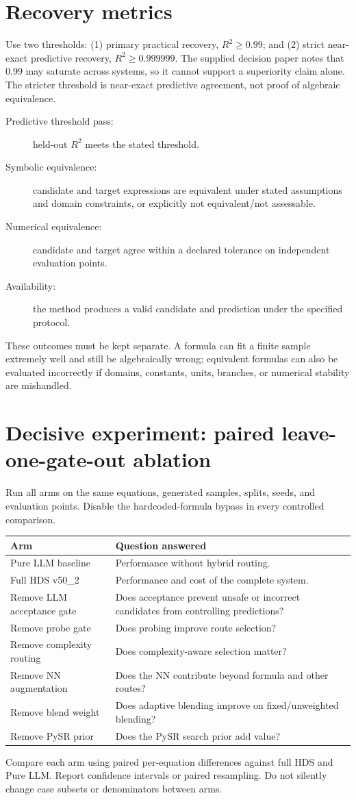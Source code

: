 \documentclass[11pt,a4paper]{article}
\begin{document}
\section{Recovery metrics}
Use two thresholds: (1) primary practical recovery, $R^2\geq0.99$; and (2) strict near-exact predictive recovery, $R^2\geq0.999999$. The supplied decision paper notes that 0.99 may saturate across systems, so it cannot support a superiority claim alone. The stricter threshold is near-exact predictive agreement, not proof of algebraic equivalence.
\begin{description}
\item[Predictive threshold pass:] held-out $R^2$ meets the stated threshold.
\item[Symbolic equivalence:] candidate and target expressions are equivalent under stated assumptions and domain constraints, or explicitly not equivalent/not assessable.
\item[Numerical equivalence:] candidate and target agree within a declared tolerance on independent evaluation points.
\item[Availability:] the method produces a valid candidate and prediction under the specified protocol.
\end{description}
These outcomes must be kept separate. A formula can fit a finite sample extremely well and still be algebraically wrong; equivalent formulas can also be evaluated incorrectly if domains, constants, units, branches, or numerical stability are mishandled.
\section{Decisive experiment: paired leave-one-gate-out ablation}
Run all arms on the same equations, generated samples, splits, seeds, and evaluation points. Disable the hardcoded-formula bypass in every controlled comparison.
\begin{longtable}{p{}p{}}\toprule
\textbf{Arm}&\textbf{Question answered}\\\midrule
Pure LLM baseline&Performance without hybrid routing.\\
Full HDS v50\_2&Performance and cost of the complete system.\\
Remove LLM acceptance gate&Does acceptance prevent unsafe or incorrect candidates from controlling predictions?\\
Remove probe gate&Does probing improve route selection?\\
Remove complexity routing&Does complexity-aware selection matter?\\
Remove NN augmentation&Does the NN contribute beyond formula and other routes?\\
Remove blend weight&Does adaptive blending improve on fixed/unweighted blending?\\
Remove PySR prior&Does the PySR search prior add value?\\\bottomrule\end{longtable}
Compare each arm using paired per-equation differences against full HDS and Pure LLM. Report confidence intervals or paired resampling. Do not silently change case subsets or denominators between arms.
\end{document}
